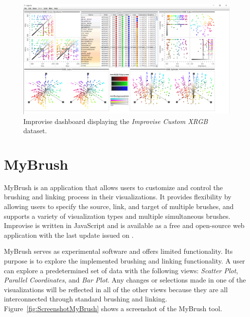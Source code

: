 \begin{figure}[tp]
\centering
\includegraphics[keepaspectratio,width=\linewidth,height=\halfh]
{images/screenshot-improvise.png}

\caption[Improvise Dashboard Screenshot]
{%
Improvise dashboard displaying the \emph{Improvise Custom XRGB} dataset.
}
\label{fig:ScreenshotImprovise}
\end{figure}




\section{MyBrush}

MyBrush \parencite{koytek2017mybrush} is an application that allows
users to customize and control the brushing and linking process in
their visualizations. It provides flexibility by allowing users to
specify the source, link, and target of multiple brushes, and supports
a variety of visualization types and multiple simultaneous
brushes. Improvise is written in JavaScript and is available as a free
and open-source web application with the last update issued on
.

MyBrush serves as experimental software and offers limited functionality. Its
purpose is to explore the implemented brushing and linking functionality.  A
user can explore a predetermined set of data with the following views:
\emph{Scatter Plot}, \emph{Parallel Coordinates}, and \emph{Bar Plot}. Any
changes or selections made in one of the visualizations will be reflected in all
of the other views because they are all interconnected through standard brushing
and linking. Figure~\ref{fig:ScreenshotMyBrush} shows a screenshot of the
MyBrush tool.




